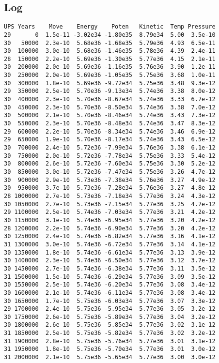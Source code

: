 \documentclass[../main.tex]{subfiles}
\begin{document}
\subsection{Log}
\singlespacing
\begin{verbatim}
UPS Years    Move    Energy    Poten   Kinetic  Temp Pressure
29       0  1.5e-11 -3.02e34 -1.80e35  8.79e34  5.00  3.5e-10
30   50000  2.3e-10  5.68e36 -1.68e35  5.79e36  4.93  6.5e-11
30  100000  3.0e-10  5.68e36 -1.46e35  5.78e36  4.39  2.4e-11
28  150000  2.2e-10  5.69e36 -1.30e35  5.77e36  4.15  2.1e-11
30  200000  2.0e-10  5.69e36 -1.16e35  5.76e36  3.90  1.2e-11
30  250000  2.0e-10  5.69e36 -1.05e35  5.75e36  3.68  1.0e-11
30  300000  1.8e-10  5.69e36 -9.72e34  5.75e36  3.48  9.3e-12
29  350000  2.5e-10  5.70e36 -9.13e34  5.74e36  3.38  8.0e-12
30  400000  2.3e-10  5.70e36 -8.67e34  5.74e36  3.33  6.7e-12
30  450000  2.3e-10  5.70e36 -8.50e34  5.74e36  3.38  7.0e-12
30  500000  2.1e-10  5.70e36 -8.46e34  5.74e36  3.43  7.3e-12
30  550000  2.3e-10  5.70e36 -8.48e34  5.74e36  3.47  8.3e-12
29  600000  2.2e-10  5.70e36 -8.34e34  5.74e36  3.46  6.9e-12
29  650000  1.9e-10  5.70e36 -8.17e34  5.74e36  3.43  6.5e-12
30  700000  2.4e-10  5.72e36 -7.99e34  5.76e36  3.38  6.1e-12
30  750000  2.0e-10  5.72e36 -7.78e34  5.75e36  3.33  5.4e-12
30  800000  2.6e-10  5.72e36 -7.60e34  5.75e36  3.30  5.2e-12
30  850000  3.0e-10  5.72e36 -7.47e34  5.75e36  3.26  4.7e-12
30  900000  2.9e-10  5.73e36 -7.38e34  5.76e36  3.27  4.9e-12
30  950000  3.7e-10  5.73e36 -7.28e34  5.76e36  3.27  4.8e-12
28 1000000  2.7e-10  5.73e36 -7.18e34  5.77e36  3.24  4.3e-12
30 1050000  2.7e-10  5.73e36 -7.15e34  5.77e36  3.25  4.7e-12
29 1100000  2.5e-10  5.74e36 -7.03e34  5.77e36  3.21  4.2e-12
30 1150000  3.1e-10  5.74e36 -6.95e34  5.77e36  3.20  4.2e-12
28 1200000  2.2e-10  5.74e36 -6.90e34  5.77e36  3.20  4.2e-12
30 1250000  2.4e-10  5.74e36 -6.82e34  5.77e36  3.16  4.1e-12
31 1300000  3.0e-10  5.74e36 -6.72e34  5.77e36  3.14  4.1e-12
30 1350000  1.8e-10  5.74e36 -6.61e34  5.77e36  3.13  3.9e-12
30 1400000  2.3e-10  5.74e36 -6.50e34  5.77e36  3.12  3.7e-12
30 1450000  2.7e-10  5.74e36 -6.38e34  5.77e36  3.11  3.5e-12
31 1500000  1.5e-10  5.74e36 -6.29e34  5.77e36  3.09  3.5e-12
30 1550000  2.5e-10  5.74e36 -6.20e34  5.77e36  3.08  3.4e-12
30 1600000  2.1e-10  5.74e36 -6.11e34  5.77e36  3.08  3.4e-12
30 1650000  1.7e-10  5.75e36 -6.03e34  5.77e36  3.07  3.3e-12
29 1700000  2.4e-10  5.75e36 -5.95e34  5.77e36  3.05  3.2e-12
30 1750000  2.6e-10  5.75e36 -5.89e34  5.77e36  3.04  3.2e-12
30 1800000  2.6e-10  5.75e36 -5.85e34  5.77e36  3.02  3.1e-12
31 1850000  2.5e-10  5.75e36 -5.82e34  5.77e36  3.02  3.2e-12
31 1900000  2.8e-10  5.75e36 -5.76e34  5.77e36  3.01  3.1e-12
31 1950000  1.8e-10  5.75e36 -5.70e34  5.77e36  3.01  3.0e-12
31 2000000  2.1e-10  5.75e36 -5.65e34  5.77e36  3.00  3.0e-12
\end{verbatim}
\onehalfspacing
\end{document}
